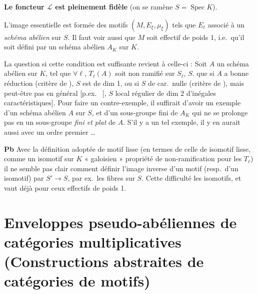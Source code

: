 \documentclass[11pt,a4paper]{article}
\begin{document}
\textbf{Le foncteur $\mathcal{L}$ est pleinement fidèle} (on se ramène
 $S = \operatorname{Spec} K$).

L'image essentielle est \struck{\ill{}}  formée des motifs
$(M, E_{\xi}, \mu_{\xi})$ tels que  $E_{t}$ 
 \ill{}  
associé à un \emph{schéma abélien} sur $S$. Il faut voir aussi que $M$ soit
effectif de poids 1, i.e.\ qu'il soit défini par un schéma abélien $A_{K}$
sur $K$. \struck{\ill{}} \struck{\ill{}}

La question si cette condition est suffisante revient à celle-ci : Soit $A$ un
schéma abélien sur $K$,  tel que $\forall \ell$, 
$T_{\ell}(A)$ soit non ramifié sur $S_{\ell}$,  $S$.
 que si $A$ a bonne réduction
\ill{} (critère de ), \ill{} $S$ est de
dim 1, ou si $S$ de car.\ nulle (critère de \ill{}), mais peut-être pas en
général [p.ex.\ \ill{}  ],
 $S$ local régulier de dim 2 d'inégales caractéristiques].
Pour faire un contre-exemple, il suffirait d'avoir un exemple d'un schéma
abélien $A$ sur $S$, et d'un sous-groupe fini de $A_{K}$ qui ne se prolonge pas
en un sous-groupe \emph{fini et plat} de $A$. S'il y a un tel exemple, il y en
aurait aussi avec un ordre premier …

\textbf{Pb} Avec la définition adoptée de motif lisse (en termes de celle de
isomotif lisse, comme un isomotif sur $K$ « galoisien »  propriété de non-ramification pour les $T_{\ell}$) il ne semble
pas clair comment définir l'image inverse d'un motif (resp.\ d'un isomotif)
par $S' \to S$, par ex.\ les fibres \ill{} sur $S$. Cette difficulté
\struck{\ill{}}  \ill{} les isomotifs, et vaut déjà pour
ceux effectifs de poids 1.

\section{Enveloppes pseudo-abéliennes de catégories multiplicatives
(Constructions abstraites de catégories de motifs)}
\end{document}
